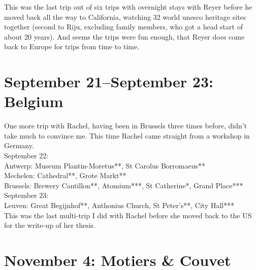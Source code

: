 This was the last trip out of six trips with overnight stays with Reyer before he moved back all the way to California, watching 32 world unesco heritage sites together (second to Riju, excluding family members, who got a head start of about 20 years). And seems the trips were fun enough, that Reyer does come back to Europe for trips from time to time.\\

\section{September 21--September 23: Belgium}
\label{Belgium2018}

One more trip with Rachel, having been in Brussels three times before, didn't take much to convince me. This time Rachel came straight from a workshop in Germany.\\

September 22:\\
Antwerp: Museum Plantin-Moretus**, St Carolus Borromaeus**\\
Mechelen: Cathedral**, Grote Markt**\\
Brussels: Brewery Cantillon**, Atomium***, St Catherine*, Grand Place***\\

September 23:\\
Leuven: Great Begijnhof**, Anthonius Church, St Peter's**, City Hall***\\

This was the last multi-trip I did with Rachel before she moved back to the US for the write-up of her thesis.

\section{November 4: Motiers \& Couvet}
\label{Motiers2018}

